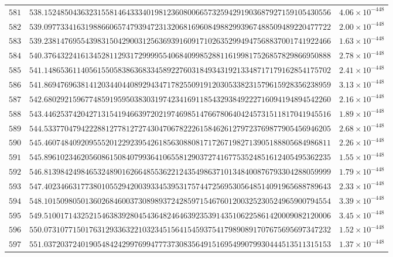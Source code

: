 \documentclass[12pt,reqno]{amsart}
\theoremstyle{remark}
\begin{document}
\begin{longtable}{clc}
$581$ & $538.1524850436323155814643334019812360800665732594291903687927159105430556$ & $4.06\times 10^{-448}$ \\
$582$ & $539.0977334163198866065747939472313206816960849882993967488509489220477722$ & $2.00\times 10^{-448}$ \\
$583$ & $539.2381476955439831504290031256369391609171026352994947568837001741922466$ & $1.63\times 10^{-448}$ \\
$584$ & $540.3764322416134528112931729999554068409985288116199817526857829866950888$ & $2.78\times 10^{-448}$ \\
$585$ & $541.1486536114056155058386368334589227603184934319213348717179162854175702$ & $2.41\times 10^{-448}$ \\
$586$ & $541.8694769638141203440440892943471782550919120305338231579615928356238959$ & $3.13\times 10^{-448}$ \\
$587$ & $542.6802921596774859195950383031974234169118543293849222716094194894542260$ & $2.16\times 10^{-448}$ \\
$588$ & $543.4462537420427131541946639720219746985147667806404245731511817041945516$ & $1.89\times 10^{-448}$ \\
$589$ & $544.5337704794222881277812727430470678222615846261279723769877905456946205$ & $2.68\times 10^{-448}$ \\
$590$ & $545.4607484092095552012292395426185630880817172671982713905188805684986811$ & $2.26\times 10^{-448}$ \\
$591$ & $545.8961023462056086150840799364106558129037274167753524851612405495362235$ & $1.55\times 10^{-448}$ \\
$592$ & $546.8139842498465324890162664855362212435498637101348400876793304288059999$ & $1.79\times 10^{-448}$ \\
$593$ & $547.4023466317738010552942003933453953175744725695305648514091965688789643$ & $2.33\times 10^{-448}$ \\
$594$ & $548.1015098050136026846003730898937242859715467601200325230524965900794554$ & $3.39\times 10^{-448}$ \\
$595$ & $549.5100171432521546383928045436482464639235391435106225861420009082120006$ & $3.45\times 10^{-448}$ \\
$596$ & $550.0731077150176312933632210323451564154593754179890891707675695697347232$ & $1.52\times 10^{-448}$ \\
$597$ & $551.0372037240190548424299769947773730835649151695499079930444513511315153$ & $1.37\times 10^{-448}$ \\

\end{longtable}
\end{document}
